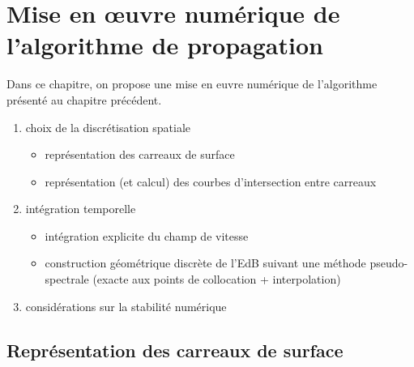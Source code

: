 \chapter{Mise en \oe uvre numérique de l'algorithme de propagation}
\label{chap:methode_numerique}

Dans ce chapitre, on propose une mise en \ou euvre numérique de l'algorithme présenté au chapitre précédent. 
\begin{enumerate}
	\item choix de la discrétisation spatiale
	\begin{itemize}
		\item représentation des carreaux de surface
		\item représentation (et calcul) des courbes d'intersection entre carreaux
	\end{itemize}
	\item intégration temporelle
	\begin{itemize}
		\item intégration explicite du champ de vitesse 
		\item construction géométrique discrète de l'EdB suivant une méthode pseudo-spectrale (exacte aux points de collocation + interpolation)
	\end{itemize}
	\item considérations sur la stabilité numérique
\end{enumerate}



\section{Représentation des carreaux de surface}
